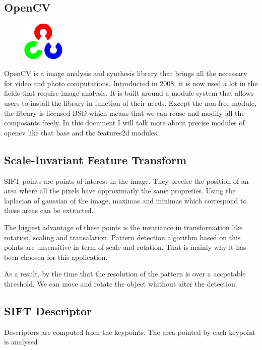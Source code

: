 \documentclass[english,a4paper,11pt]{report}
\begin{document}
\subsection{OpenCV}
\begin{figure}
\vspace{-7mm}
\includegraphics[width=2cm]{images_not_compressed/opencv_logo.png}
\end{figure}
\par OpenCV is a image analysis and synthesis library that brings all the necessary for video and photo computations. Introducted in 2008, it is now used a lot in the fields that require image analysis.
It is built around a module system that allows users to install the library in function of their needs.
Except the non free module, the library is licensed BSD which means that we can reuse and modify all the composants freely.
In this document I will talk more about precise modules of opencv like that base and the features2d modules. 
\subsection[SIFT points]{Scale-Invariant Feature Transform}
\par SIFT points are points of interest in the image. They precise the position of an area where all the pixels have approximatly the same propreties. Using the laplacian of gaussian of the image, maximas and minimas which correspond to these areas can be extracted.
\par The biggest advantage of these points is the invariance in transformation like rotation, scaling and transalation. Pattern detection algorithm based on this points are unsensitive in term of scale and rotation. That is mainly why it has been choosen for this application.
\par As a result, by the time that the resolution of the pattern is over a accpetable threshold. We can move and rotate the object whithout alter the detection.

\subsection[Descriptor]{SIFT Descriptor}
\par Descriptors are computed from the keypoints. The area pointed by each keypoint is analysed \cite{AM}
\end{document}
